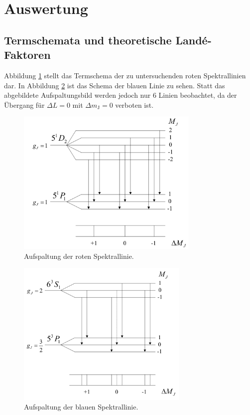 \newpage
\section{Auswertung}
\label{sec:Auswertung}
\subsection{Termschemata und theoretische Landé-Faktoren}
Abbildung \ref{fig:cdrot} stellt das Termschema der zu untersuchenden roten Spektrallinien dar.
In Abbildung \ref{fig:cdblau} ist das Schema der blauen Linie zu sehen.
Statt das abgebildete Aufspaltungsbild werden jedoch nur 6 Linien beobachtet, da der Übergang für $\Delta L = 0$
mit $\Delta m_\text{J} = 0$ verboten ist.
\begin{figure}[htb]
  \centering
  \includegraphics[height=7cm]{content/pictures/cdrot.png}
  \caption{Aufspaltung der roten Spektrallinie.\cite{zeeman}}
  \label{fig:cdrot}
\end{figure}
\begin{figure}[htb]
  \centering
  \includegraphics[height=7cm]{content/pictures/cdblau.png}
  \caption{Aufspaltung der blauen Spektrallinie.\cite{zeeman}}
  \label{fig:cdblau}
\end{figure}
